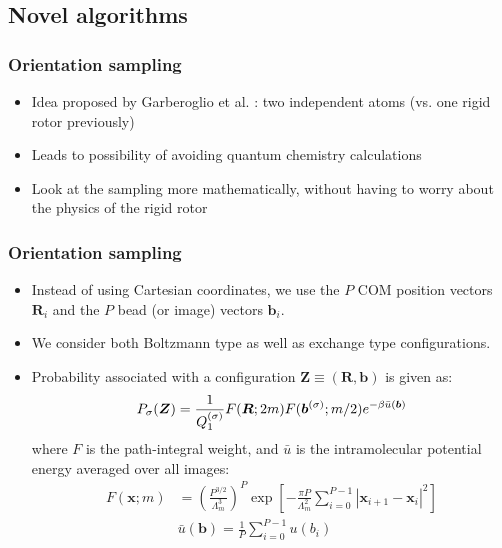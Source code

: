 \documentclass[xcolor=svgnames]{beamer}
\DeclareRobustCommand{\mbf}[1]{{\boldsymbol {#1}}}
\begin{document}
        \subsection{Novel algorithms}
        \begin{frame}
            \frametitle{Orientation sampling}
            \begin{itemize}
                \item Idea proposed by Garberoglio et al. : two independent atoms (vs. one rigid rotor previously)
                \item Leads to possibility of avoiding quantum chemistry calculations
                \item Look at the sampling more mathematically, without having to worry about the physics of the rigid rotor
            \end{itemize}
        \end{frame}
        \begin{frame}
            \frametitle{Orientation sampling}
            \begin{itemize}
                \item Instead of using Cartesian coordinates, we use the $P$ COM position vectors $\mbf{R}_i$ and the $P$ bead (or image) vectors $\mbf{b}_i$.
                \item We consider both Boltzmann type as well as exchange type configurations.
                \item Probability associated with a configuration $\mbf{Z} \equiv (\mbf{R},\mbf{b})$ is given as:
                \begin{equation*}
                \label{eq:PIProb}
                    P_\sigma (\mbf{Z}) = \frac{1}{Q_1^{{\rm (\sigma)}}} F(\mbf{R};2m) F(\mbf{b}^{(\sigma)};m/2) e^{ - \beta \bar u(\mbf{b})}
                \end{equation*}
                where $F$ is the path-integral weight, and $\bar u$ is the intramolecular potential energy averaged over all images:
                \begin{equation*}
                    \begin{aligned}
                        F(\mbf{x};m) &= \left( \frac{P^{3/2}} {\Lambda _m^3} \right)^P \exp \left[ - \frac{\pi P}{\Lambda _m^2}\sum\limits_{i = 0}^{P-1} \left| \mbf{x}_{i + 1} - \mbf{x}_i \right|^2 \right]\\
                        &\bar u(\mbf{b}) = \frac{1}{P}\sum\limits_{i=0}^{P-1} {u\left(b_i \right)}
                    \end{aligned}
                \end{equation*}
            \end{itemize}
        \end{frame}
\end{document}

